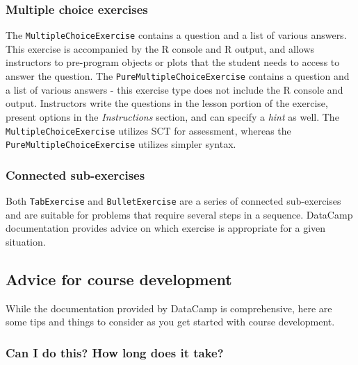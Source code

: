 \documentclass{tise_style_doi}
\begin{document}
\subsubsection{Multiple choice exercises}

The \texttt{MultipleChoiceExercise} contains a question and a list of various answers.
This exercise is accompanied by the R console and R output, and allows instructors to
pre-program objects or plots that the student needs to access to answer the question.
The \texttt{PureMultipleChoiceExercise} contains a question and a list of various
answers - this exercise type does not include the R console and output. 
Instructors write the questions in the lesson portion
of the exercise, present options in the \textit{Instructions} section, and can specify a
\textit{hint} as well. The \texttt{MultipleChoiceExercise} utilizes SCT for assessment,
whereas the \texttt{PureMultipleChoiceExercise} utilizes simpler syntax.

\subsubsection{Connected sub-exercises}

Both \texttt{TabExercise} and \texttt{BulletExercise} are a series of connected
sub-exercises and are suitable for problems that require several steps in a sequence.
DataCamp documentation provides advice on which exercise is appropriate for a
given situation.

\subsection{Advice for course development}

While the documentation provided by DataCamp is comprehensive, here are some tips
and things to consider as you get started with course development.

\subsubsection{Can I do this? How long does it take?}
\end{document}
